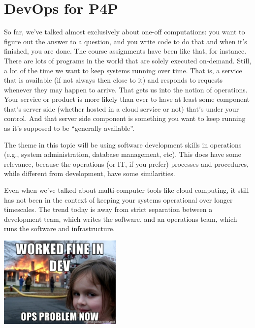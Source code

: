 




\section*{DevOps for P4P}
So far, we've talked almost exclusively about one-off computations:
you want to figure out the answer to a question, and you write code to
do that and when it's finished, you are done. 
The course assignments have been like that, for instance. There are lots
of programs in the world that are solely executed on-demand. Still, a lot
of the time we want to keep systems running over time. That is, a service
that is available (if not always then close to it) and responds to requests
whenever they may happen to arrive. That gets us
into the notion of operations. Your service or product is more likely than 
ever to have at least some component that's server side (whether hosted
in a cloud service or not) that's under your control. And that server side
component is something you want to keep running as it's supposed to be 
``generally available''.

The theme in this topic will be using software development skills in
operations (e.g., system administration, database management, etc). This
does have some relevance, because the operations (or IT, if you prefer)
processes and procedures, while different from development, have some
similarities. 

Even when we've talked about multi-computer tools like cloud
computing, it still has not been in the context of keeping your
systems operational over longer timescales. The trend today is away
from strict separation between a development team, which writes the
software, and an operations team, which runs the software and infrastructure.

\begin{center}
	\includegraphics[width=0.45\textwidth]{images/devops.jpg}
\end{center}

